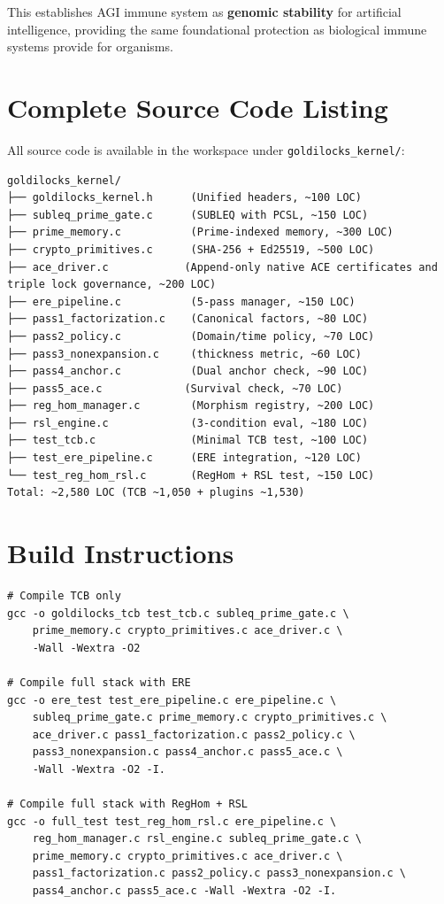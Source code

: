 \documentclass[11pt,a4paper]{article}
\begin{document}
This establishes AGI immune system as \textbf{genomic stability} for artificial intelligence, providing the same foundational protection as biological immune systems provide for organisms.

\newpage
\appendix
\section{Complete Source Code Listing}

All source code is available in the workspace under \texttt{goldilocks\_kernel/}:

\begin{verbatim}
goldilocks_kernel/
├── goldilocks_kernel.h      (Unified headers, ~100 LOC)
├── subleq_prime_gate.c      (SUBLEQ with PCSL, ~150 LOC)
├── prime_memory.c           (Prime-indexed memory, ~300 LOC)
├── crypto_primitives.c      (SHA-256 + Ed25519, ~500 LOC)
├── ace_driver.c            (Append-only native ACE certificates and triple lock governance, ~200 LOC)
├── ere_pipeline.c           (5-pass manager, ~150 LOC)
├── pass1_factorization.c    (Canonical factors, ~80 LOC)
├── pass2_policy.c           (Domain/time policy, ~70 LOC)
├── pass3_nonexpansion.c     (thickness metric, ~60 LOC)
├── pass4_anchor.c           (Dual anchor check, ~90 LOC)
├── pass5_ace.c             (Survival check, ~70 LOC)
├── reg_hom_manager.c        (Morphism registry, ~200 LOC)
├── rsl_engine.c             (3-condition eval, ~180 LOC)
├── test_tcb.c               (Minimal TCB test, ~100 LOC)
├── test_ere_pipeline.c      (ERE integration, ~120 LOC)
└── test_reg_hom_rsl.c       (RegHom + RSL test, ~150 LOC)
Total: ~2,580 LOC (TCB ~1,050 + plugins ~1,530)
\end{verbatim}

\section{Build Instructions}

\begin{verbatim}
# Compile TCB only
gcc -o goldilocks_tcb test_tcb.c subleq_prime_gate.c \
    prime_memory.c crypto_primitives.c ace_driver.c \
    -Wall -Wextra -O2

# Compile full stack with ERE
gcc -o ere_test test_ere_pipeline.c ere_pipeline.c \
    subleq_prime_gate.c prime_memory.c crypto_primitives.c \
    ace_driver.c pass1_factorization.c pass2_policy.c \
    pass3_nonexpansion.c pass4_anchor.c pass5_ace.c \
    -Wall -Wextra -O2 -I.

# Compile full stack with RegHom + RSL
gcc -o full_test test_reg_hom_rsl.c ere_pipeline.c \
    reg_hom_manager.c rsl_engine.c subleq_prime_gate.c \
    prime_memory.c crypto_primitives.c ace_driver.c \
    pass1_factorization.c pass2_policy.c pass3_nonexpansion.c \
    pass4_anchor.c pass5_ace.c -Wall -Wextra -O2 -I.
\end{verbatim}
\end{document}
